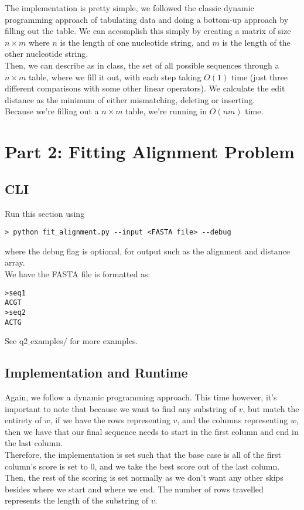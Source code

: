 \documentclass[10pt]{article}
\begin{document}
The implementation is pretty simple, we followed the classic dynamic programming approach of tabulating data and doing a bottom-up approach by filling out the table. We can accomplish this simply by creating a matrix of size $n \times m$ where $n$ is the length of one nucleotide string, and $m$ is the length of the other nucleotide string.\\

Then, we can describe as in class, the set of all possible sequences through a $n \times m$ table, where we fill it out, with each step taking $O(1)$ time (just three different comparisons with some other linear operators). We calculate the edit distance as the minimum of either mismatching, deleting or inserting.\\

Because we're filling out a $n \times m$ table, we're running in $O(nm)$ time.

\section*{Part 2: Fitting Alignment Problem}
\subsection*{CLI}
Run this section using
\begin{lstlisting}
> python fit_alignment.py --input <FASTA file> --debug
\end{lstlisting}
where the debug flag is optional, for output such as the alignment and distance array.\\

We have the FASTA file is formatted as:
\begin{lstlisting}
>seq1
ACGT
>seq2
ACTG
\end{lstlisting}
See q2$\_$examples$/$ for more examples.

\subsection*{Implementation and Runtime}
Again, we follow a dynamic programming approach. This time however, it's important to note that because we want to find any substring of $v$, but match the entirety of $w$, if we have the rows representing $v$, and the columns representing $w$, then we have that our final sequence needs to start in the first column and end in the last column.\\

Therefore, the implementation is set such that the base case is all of the first column's score is set to 0, and we take the best score out of the last column. Then, the rest of the scoring is set normally as we don't want any other skips besides where we start and where we end. The number of rows travelled represents the length of the substring of $v$.\\
\end{document}
